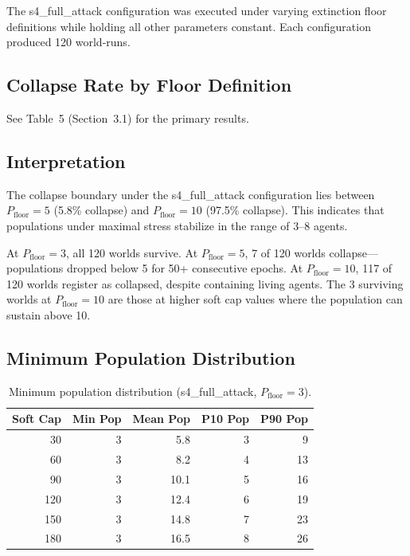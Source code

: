 \documentclass[11pt,a4paper]{article}
\begin{document}
The s4\_full\_attack configuration was executed under varying extinction floor definitions while holding all other parameters constant. Each configuration produced 120 world-runs.

\subsection{Collapse Rate by Floor Definition}

See Table~5 (Section~3.1) for the primary results.

\subsection{Interpretation}

The collapse boundary under the s4\_full\_attack configuration lies between $P_{\text{floor}} = 5$ (5.8\% collapse) and $P_{\text{floor}} = 10$ (97.5\% collapse). This indicates that populations under maximal stress stabilize in the range of 3--8 agents.

At $P_{\text{floor}} = 3$, all 120 worlds survive. At $P_{\text{floor}} = 5$, 7 of 120 worlds collapse---populations dropped below 5 for 50+ consecutive epochs. At $P_{\text{floor}} = 10$, 117 of 120 worlds register as collapsed, despite containing living agents. The 3 surviving worlds at $P_{\text{floor}} = 10$ are those at higher soft cap values where the population can sustain above 10.

\subsection{Minimum Population Distribution}

\begin{table}[H]
\centering
\caption{Minimum population distribution (s4\_full\_attack, $P_{\text{floor}} = 3$).}
\begin{tabular}{@{}rrrrr@{}}
\toprule
Soft Cap & Min Pop & Mean Pop & P10 Pop & P90 Pop \\
\midrule
30 & 3 & 5.8 & 3 & 9 \\
60 & 3 & 8.2 & 4 & 13 \\
90 & 3 & 10.1 & 5 & 16 \\
120 & 3 & 12.4 & 6 & 19 \\
150 & 3 & 14.8 & 7 & 23 \\
180 & 3 & 16.5 & 8 & 26 \\
\bottomrule
\end{tabular}
\end{table}
\end{document}
